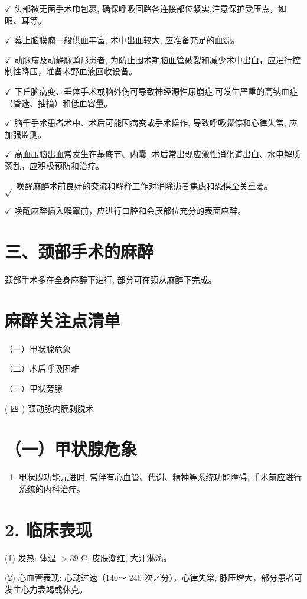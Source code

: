 \documentclass[10pt]{article}
\begin{document}
$\checkmark$ 头部被无菌手术巾包裹, 确保呼吸回路各连接部位紧实,注意保护受压点，如眼、耳等。

$\checkmark$ 幕上脑膜瘤一般供血丰富, 术中出血较大, 应准备充足的血源。

$\checkmark$ 动脉瘤及动静脉畸形患者, 为防止围术期脑血管破裂和减少术中出血，应进行控制性降压，准备术野血液回收设备。

$\checkmark$ 下丘脑病变、垂体手术或脑外伤可导致神经源性尿崩症,可发生严重的高钠血症（昏迷、抽搐）和低血容量。

$\checkmark$ 脑千手术患者术中、术后可能因病变或手术操作, 导致呼吸骤停和心律失常, 应加强监测。

$\checkmark$ 高血压脑出血常发生在基底节、内囊, 术后常出现应激性消化道出血、水电解质紊乱，应积极预防和治疗。

$\sqrt{ }$ 唤醒麻醉术前良好的交流和解释工作对消除患者焦虑和恐惧至关重要。

$\checkmark$ 唤醒麻醉插入喉罩前，应进行口腔和会厌部位充分的表面麻醉。

\section*{三、颈部手术的麻醉}
颈部手术多在全身麻醉下进行, 部分可在颈从麻醉下完成。

\section*{麻醉关注点清单}
（一）甲状腺危象

（二）术后呼吸困难

（三）甲状旁腺

( 四 ) 颈动脉内膜剥脱术

\section*{（一）甲状腺危象}
\begin{enumerate}
  \item 甲状腺功能元进时, 常伴有心血管、代谢、精神等系统功能障碍, 手术前应进行系统的内科治疗。
\end{enumerate}

\section*{2. 临床表现}
(1) 发热: 体温 $>39^{\circ} \mathrm{C}$, 皮肤潮红, 大汗淋漓。

(2) 心血管表现: 心动过速（140～ 240 次／分），心律失常, 脉压增大，部分患者可发生心力衰竭或休克。
\end{document}
